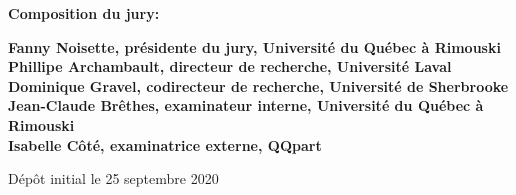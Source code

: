 \thispagestyle{empty}

\null
\vfill
\noindent \textbf{Composition du jury:}\\
\vspace{1cm}

\begin{singlespace}
  \noindent \textbf{Fanny Noisette, présidente du jury, Université du Québec à Rimouski}\\

  \noindent \textbf{Phillipe Archambault, directeur de recherche, Université Laval}\\

  \noindent \textbf{Dominique Gravel, codirecteur de recherche, Université de Sherbrooke}\\

  \noindent \textbf{Jean-Claude Brêthes, examinateur interne, Université du Québec à Rimouski}\\

  \noindent \textbf{Isabelle Côté, examinatrice externe, QQpart}\\
\end{singlespace}

\vspace{2cm}
\noindent Dépôt initial le 25 septembre 2020
\hspace{3cm}


\cleardoublepage
